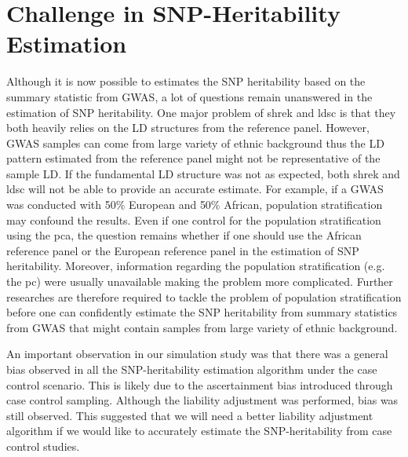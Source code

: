 \documentclass[12pt]{book}
\begin{document}
	\section{Challenge in SNP-Heritability Estimation}
	Although it is now possible to estimates the \gls{SNP} heritability based on the summary statistic from \gls{GWAS}, a lot of questions remain unanswered in the estimation of \gls{SNP} heritability.
	One major problem of \gls{shrek} and \gls{ldsc} is that they both heavily relies on the \gls{LD} structures from the reference panel.
	However, \gls{GWAS} samples can come from large variety of ethnic background thus the \gls{LD} pattern estimated from the reference panel might not be representative of the sample \gls{LD}.
	If the fundamental \gls{LD} structure was not as expected, both \gls{shrek} and \gls{ldsc} will not be able to provide an accurate estimate. 
	For example, if a \gls{GWAS} was conducted with 50\% European and 50\% African, population stratification may confound the results.
	Even if one control for the population stratification using the \gls{pca}, the question remains whether if one should use the African reference panel or the European reference panel in the estimation of \gls{SNP} heritability.
	Moreover, information regarding the population stratification (e.g. the \gls{pc}) were usually unavailable making the problem more complicated.
	Further researches are therefore required to tackle the problem of population stratification before one can confidently estimate the \gls{SNP} heritability from summary statistics from \gls{GWAS} that might contain samples from large variety of ethnic background.
	
	An important observation in our simulation study was that there was a general bias observed in all the \gls{SNP}-heritability estimation algorithm under the case control scenario.
	This is likely due to the ascertainment bias introduced through case control sampling.
	Although the liability adjustment was performed, bias was still observed. 
	This suggested that we will need a better liability adjustment algorithm if we would like to accurately estimate the \gls{SNP}-heritability from case control studies.
	
\end{document}

